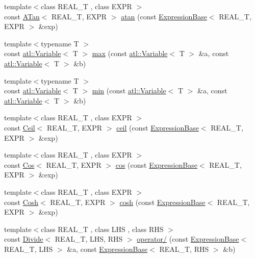 \begin{DoxyCompactItemize}
\item 
{\footnotesize template$<$class R\+E\+A\+L\+\_\+\+T , class E\+X\+P\+R $>$ }\\const \hyperlink{structatl_1_1_a_tan}{A\+Tan}$<$ R\+E\+A\+L\+\_\+\+T, E\+X\+P\+R $>$ \hyperlink{namespaceatl_a23b41d1236e98f36c483c81771800f73}{atan} (const \hyperlink{structatl_1_1_expression_base}{Expression\+Base}$<$ R\+E\+A\+L\+\_\+\+T, E\+X\+P\+R $>$ \&exp)
\item 
{\footnotesize template$<$typename T $>$ }\\const \hyperlink{structatl_1_1_variable}{atl\+::\+Variable}$<$ T $>$ \hyperlink{namespaceatl_a04ef3c373ecfd67b6abd81dbbe1ec876}{max} (const \hyperlink{structatl_1_1_variable}{atl\+::\+Variable}$<$ T $>$ \&a, const \hyperlink{structatl_1_1_variable}{atl\+::\+Variable}$<$ T $>$ \&b)
\item 
{\footnotesize template$<$typename T $>$ }\\const \hyperlink{structatl_1_1_variable}{atl\+::\+Variable}$<$ T $>$ \hyperlink{namespaceatl_a8e359db3f98573887309ad2aa39ccedc}{min} (const \hyperlink{structatl_1_1_variable}{atl\+::\+Variable}$<$ T $>$ \&a, const \hyperlink{structatl_1_1_variable}{atl\+::\+Variable}$<$ T $>$ \&b)
\item 
{\footnotesize template$<$class R\+E\+A\+L\+\_\+\+T , class E\+X\+P\+R $>$ }\\const \hyperlink{structatl_1_1_ceil}{Ceil}$<$ R\+E\+A\+L\+\_\+\+T, E\+X\+P\+R $>$ \hyperlink{namespaceatl_a3c880f96cf13588a11a0728e30973e97}{ceil} (const \hyperlink{structatl_1_1_expression_base}{Expression\+Base}$<$ R\+E\+A\+L\+\_\+\+T, E\+X\+P\+R $>$ \&exp)
\item 
{\footnotesize template$<$class R\+E\+A\+L\+\_\+\+T , class E\+X\+P\+R $>$ }\\const \hyperlink{structatl_1_1_cos}{Cos}$<$ R\+E\+A\+L\+\_\+\+T, E\+X\+P\+R $>$ \hyperlink{namespaceatl_ae2f0a1d943a1ed6752f76db7daebe96d}{cos} (const \hyperlink{structatl_1_1_expression_base}{Expression\+Base}$<$ R\+E\+A\+L\+\_\+\+T, E\+X\+P\+R $>$ \&exp)
\item 
{\footnotesize template$<$class R\+E\+A\+L\+\_\+\+T , class E\+X\+P\+R $>$ }\\const \hyperlink{structatl_1_1_cosh}{Cosh}$<$ R\+E\+A\+L\+\_\+\+T, E\+X\+P\+R $>$ \hyperlink{namespaceatl_a8c5ea021d776962f7adaca0e974fc321}{cosh} (const \hyperlink{structatl_1_1_expression_base}{Expression\+Base}$<$ R\+E\+A\+L\+\_\+\+T, E\+X\+P\+R $>$ \&exp)
\item 
{\footnotesize template$<$class R\+E\+A\+L\+\_\+\+T , class L\+H\+S , class R\+H\+S $>$ }\\const \hyperlink{structatl_1_1_divide}{Divide}$<$ R\+E\+A\+L\+\_\+\+T, L\+H\+S, R\+H\+S $>$ \hyperlink{namespaceatl_a202008228dcaf7271a82563ca98bc247}{operator/} (const \hyperlink{structatl_1_1_expression_base}{Expression\+Base}$<$ R\+E\+A\+L\+\_\+\+T, L\+H\+S $>$ \&a, const \hyperlink{structatl_1_1_expression_base}{Expression\+Base}$<$ R\+E\+A\+L\+\_\+\+T, R\+H\+S $>$ \&b)

\end{DoxyCompactItemize}

